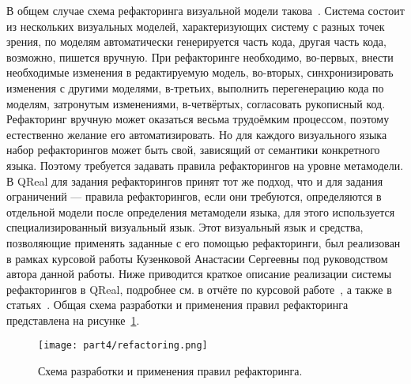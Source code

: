 В общем случае схема рефакторинга визуальной модели такова~\cite{mens2007challenges}.
Система состоит из нескольких визуальных моделей, характеризующих систему с разных точек зрения, по моделям автоматически 
генерируется часть кода, другая часть кода, возможно, пишется вручную. При рефакторинге 
необходимо, во-первых, внести необходимые изменения в редактируемую модель, во-вторых, 
синхронизировать изменения с другими моделями, в-третьих, выполнить перегенерацию кода 
по моделям, затронутым изменениями, в-четвёртых, согласовать рукописный код. Рефакторинг 
вручную может оказаться весьма трудоёмким процессом, поэтому естественно желание его 
автоматизировать. Но для каждого визуального языка набор рефакторингов может быть свой, 
зависящий от семантики конкретного языка. Поэтому требуется задавать правила рефакторингов 
на уровне метамодели. В QReal для задания рефакторингов принят тот же подход, что и 
для задания ограничений --- правила рефакторингов, если они требуются, определяются 
в отдельной модели после определения метамодели языка, для этого используется специализированный 
визуальный язык. Этот визуальный язык и средства, позволяющие применять заданные с его 
помощью рефакторинги, был реализован в рамках курсовой работы Кузенковой Анастасии Сергеевны 
под руководством автора данной работы. Ниже приводится краткое описание реализации 
системы рефакторингов в QReal, подробнее см. в отчёте по курсовой работе~\cite{kuzenkova2012course}, 
а также в статьях~\cite{kuzenkova2013refactoring, kuzenkova2012refactorings}. 
Общая схема разработки и применения правил рефакторинга представлена на рисунке~\ref{image:refactoring}.

\begin{figure} [ht]
	\begin{center}
		\texttt{[image: part4/refactoring.png]}
		\caption{Схема разработки и применения правил рефакторинга.}
		\label{image:refactoring}
	\end{center}
\end{figure}

